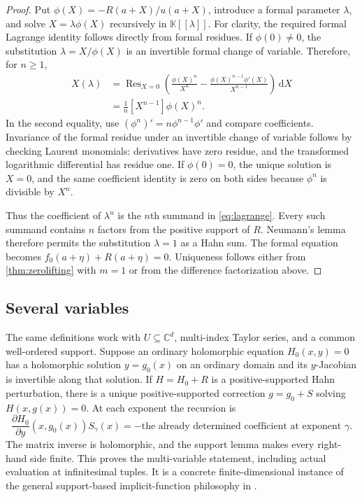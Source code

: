\documentclass[11pt,letterpaper]{article}
\numberwithin{equation}{section}
\theoremstyle{definition}
\theoremstyle{remark}
\newcommand{\K}{\mathbb{K}}
\newcommand{\C}{\mathbb{C}}
\newcommand{\dd}{\,\mathrm{d}}
\newcommand{\Res}{\operatorname{Res}}
\begin{document}
\begin{proof}
Put $\phi(X)=-R(a+X)/u(a+X)$, introduce a formal parameter $\lambda$,
and solve $X=\lambda\phi(X)$ recursively in $\K[[\lambda]]$.
For clarity, the required formal Lagrange identity follows directly from
formal residues. If $\phi(0)\ne0$, the substitution
$\lambda=X/\phi(X)$ is an invertible formal change of variable. Therefore,
for $n\ge1$,
\begin{align*}
 [\lambda^n]X(\lambda)
 &=\Res_{X=0}\left(
 \frac{\phi(X)^n}{X^n}
 -\frac{\phi(X)^{n-1}\phi'(X)}{X^{n-1}}\right)\dd X\\
 &=\frac1n[X^{n-1}]\phi(X)^n.
\end{align*}
In the second equality, use $(\phi^n)'=n\phi^{n-1}\phi'$ and compare
coefficients. Invariance of the formal residue under an invertible change
of variable follows by checking Laurent monomials: derivatives have zero
residue, and the transformed logarithmic differential has residue one.
If $\phi(0)=0$, the unique solution is $X=0$, and the same coefficient
identity is zero on both sides because $\phi^n$ is divisible by $X^n$.

Thus the coefficient of $\lambda^n$ is the $n$th summand in
\eqref{eq:lagrange}. Every such summand contains $n$ factors from the
positive support of $R$. Neumann's lemma
therefore permits the substitution $\lambda=1$ as a Hahn sum. The formal
equation becomes $f_0(a+\eta)+R(a+\eta)=0$. Uniqueness follows either from
\cref{thm:zerolifting} with $m=1$ or from the difference factorization above.
\end{proof}

\subsection{Several variables}

The same definitions work with $U\subseteq\C^d$, multi-index Taylor series,
and a common well-ordered support. Suppose an ordinary holomorphic equation
$H_0(x,y)=0$ has a holomorphic solution $y=g_0(x)$ on an ordinary domain and
its $y$-Jacobian is invertible along that solution. If
$H=H_0+R$ is a positive-supported Hahn perturbation, there is a unique
positive-supported correction $g=g_0+S$ solving $H(x,g(x))=0$.
At each exponent the recursion is
\[
 \frac{\partial H_0}{\partial y}(x,g_0(x))S_\gamma(x)
   =-\text{the already determined coefficient at exponent }\gamma.
\]
The matrix inverse is holomorphic, and the support lemma makes every
right-hand side finite. This proves the multi-variable statement, including
actual evaluation at infinitesimal tuples. It is a concrete finite-dimensional
instance of the general support-based implicit-function philosophy in
\cite{vdH}.
\end{document}
